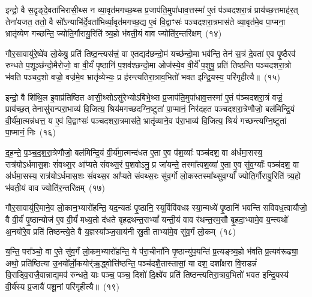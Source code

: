 {\anuvakamend[{आर्ध्नु॑वन्त्र्य॒हाभ्या॑म॒स्मिन्थ्स॑विवध॒त्वाय॒ प्रति॑ष्ठित्या॒ एक॑त्रिꣳशच्च}]}%

इन्द्रो॒ वै स॒दृङ्दे॒वता॑भिरासी॒थ्स न व्या॒वृत॑मगच्छ॒थ्स प्र॒जा\-प॑ति॒मुपा॑धाव॒त्तस्मा॑ ए॒तं प॑ञ्चदशरा॒त्रं प्राय॑च्छ॒त्तमाह॑र॒त् तेना॑यजत॒ ततो॒ वै सो᳚\-ऽन्याभि॑र्दे॒वता॑भिर्व्या॒वृत॑मगच्छ॒द्य ए॒वं वि॒द्वाꣳसः॑ पञ्चदशरा॒त्रमास॑ते व्या॒वृत॑मे॒व पा॒प्मना॒ भ्रातृ॑व्येण गच्छन्ति॒ ज्योति॒र्गौरायु॒रिति॑ त्र्य॒हो भ॑वती॒यं वाव ज्योति॑र॒न्तरि॑क्षम्~(१४)

गौर॒सावायु॑रे॒ष्वे॑व लो॒केषु॒ प्रति॑ तिष्ठ॒न्त्यस॑त्त्रं॒ वा ए॒तद्यद॑छन्दो॒मं यच्छ॑न्दो॒मा भव॑न्ति॒ तेन॑ स॒त्रं दे॒वता॑ ए॒व पृ॒ष्ठैरव॑ रुन्धते प॒शूञ्छ॑न्दो॒मैरोजो॒ वा वी॒र्यं॑ पृ॒ष्ठानि॑ प॒शव॑श्छन्दो॒मा ओज॑स्ये॒व वी॒र्ये॑ प॒शुषु॒ प्रति॑ तिष्ठन्ति पञ्चदशरा॒त्रो भ॑वति पञ्चद॒शो वज्रो॒ वज्र॑मे॒व भ्रातृ॑व्येभ्यः॒ प्र ह॑रन्त्यतिरा॒त्राव॒भितो॑ भवत इन्द्रि॒यस्य॒ परि॑गृहीत्यै॥~(१५)

{\anuvakamend[{अ॒न्तरि॑क्षमिन्द्रि॒यस्यैक॑ञ्च}]}%

इन्द्रो॒ वै शि॑थि॒ल इ॒वाप्र॑तिष्ठित आसी॒थ्सो\-ऽसु॑रेभ्यो\-ऽबिभे॒थ्स प्र॒जा\-प॑ति॒मुपा॑धाव॒त्तस्मा॑ ए॒तं प॑ञ्चदशरा॒त्रं वज्रं॒ प्राय॑च्छ॒त् तेनासु॑रान्परा॒भाव्य॑ वि॒जित्य॒ श्रिय॑मगच्छदग्नि॒ष्टुता॑ पा॒प्मानं॒ निर॑दहत पञ्चदशरा॒त्रेणौजो॒ बल॑मिन्द्रि॒यं वी॒र्य॑मा॒त्मन्न॑धत्त॒ य ए॒वं वि॒द्वाꣳसः॑ पञ्चदशरा॒त्रमास॑ते॒ भ्रातृ॑व्याने॒व प॑रा॒भाव्य॑ वि॒जित्य॒ श्रियं॑ गच्छन्त्यग्नि॒ष्टुता॑ पा॒प्मानं॒ निः~(१६)

द॒ह॒न्ते॒ प॒ञ्च॒द॒श॒रा॒त्रेणौजो॒ बल॑मिन्द्रि॒यं वी॒र्य॑मा॒त्मन्द॑धत ए॒ता ए॒व प॑श॒व्याः᳚ पञ्च॑दश॒ वा अ॑र्धमा॒सस्य॒ रात्र॑यो\-ऽ\-र्धमास॒शः सं॑वथ्स॒र आ᳚प्यते संवथ्स॒रं प॒शवो\-ऽनु॒ प्र जा॑यन्ते॒ तस्मा᳚त्पश॒व्या॑ ए॒ता ए॒व सु॑व॒र्ग्याः᳚ पञ्च॑दश॒ वा अ॑र्धमा॒सस्य॒ रात्र॑यो\-ऽर्धमास॒शः सं॑वथ्स॒र आ᳚प्यते संवथ्स॒रः सु॑व॒र्गो लो॒कस्तस्मा᳚थ्सुव॒र्ग्या᳚ ज्योति॒र्गौरायु॒रिति॑ त्र्य॒हो भ॑वती॒यं वाव ज्योति॑र॒न्तरि॑क्षम्~(१७)

गौर॒सावायु॑रि॒माने॒व लो॒कान॒भ्यारो॑हन्ति॒ यद॒न्यतः॑ पृ॒ष्ठानि॒ स्युर्विवि॑वधꣴ स्या॒न्मध्ये॑ पृ॒ष्ठानि॑ भवन्ति सविवध॒त्वायौजो॒ वै वी॒र्यं॑ पृ॒ष्ठान्योज॑ ए॒व वी॒र्यं॑ मध्य॒तो द॑धते बृहद्रथन्त॒रा\-भ्यां᳚ यन्ती॒यं वाव र॑थन्त॒रम॒सौ बृ॒हदा॒भ्यामे॒व य॒न्त्यथो॑ अ॒नयो॑रे॒व प्रति॑ तिष्ठन्त्ये॒ते वै य॒ज्ञस्या᳚ञ्ज॒साय॑नी स्रु॒ती ताभ्या॑मे॒व सु॑व॒र्गं लो॒कम्~(१८)

य॒न्ति॒ परा᳚ञ्चो॒ वा ए॒ते सु॑व॒र्गं लो॒कम॒भ्यारो॑हन्ति॒ ये प॑रा॒चीना॑नि पृ॒ष्ठान्यु॑प॒यन्ति॑ प्र॒त्यङ्त्र्य॒हो भ॑वति प्र॒त्यव॑रूढ्या॒ अथो॒ प्रति॑ष्ठित्या उ॒भयो᳚र्लो॒कयोर्॑ऋ॒द्ध्वोत्ति॑ष्ठन्ति॒ पञ्च॑दशै॒तास्तासां॒ या दश॒ दशा᳚क्षरा वि॒राडन्नं॑ वि॒राड्वि॒राजै॒वान्नाद्य॒\-मव॑ रुन्धते॒ याः पञ्च॒ पञ्च॒ दिशो॑ दि॒क्ष्वे॑व प्रति॑ तिष्ठन्त्यतिरा॒त्राव॒भितो॑ भवत इन्द्रि॒यस्य॑ वी॒र्य॑स्य प्र॒जायै॑ पशू॒नां परि॑गृहीत्यै॥~(१९)

